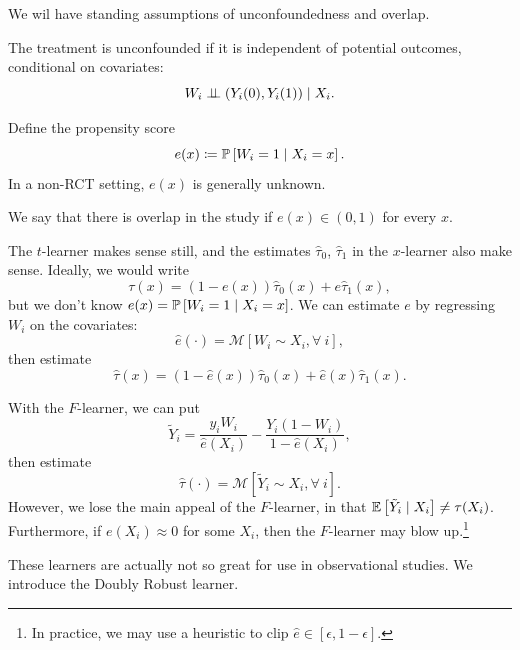\begin{assumption}
	We wil have standing assumptions of unconfoundedness and overlap.
\end{assumption}

\begin{definition}[Unconfoundedness]
	The treatment is unconfounded if it is independent of potential outcomes, conditional on covariates: \[
		W_i \ind \left( Y_i(0), Y_i(1) \right) \mid X_i
	.\] 
\end{definition}
\begin{definition}
	Define the propensity score \[
		e(x) \coloneqq \P\left[W_i = 1 \mid X_i=x\right] 
	.\] In a non-RCT setting, $e(x)$ is generally unknown.

		We say that there is overlap in the study if $e(x) \in (0,1)$ for every $x$.
\end{definition}

The $t$-learner makes sense still, and the estimates $\hat{\tau}_0$, $\hat{\tau}_1$ in the $x$-learner also make sense. Ideally, we would write \[
	\tau(x) = (1-e(x)) \hat{\tau}_0(x) + e \hat{\tau}_1(x)
,\] but we don't know $e(x) = \P\left[W_i = 1 \mid X_i = x\right] $. We can estimate $e$ by regressing $W_i$ on the covariates: \[
	\hat{e}(\cdot ) = \mathscr{M}\left[ W_i \sim X_i, \forall\ i \right]
,\] then estimate \[
	\hat{\tau}(x) = (1-\hat{e}(x)) \hat{\tau}_0(x) + \hat{e}(x) \hat{\tau}_1(x)
.\] 

With the $F$-learner, 
we can put \[
	\tilde{Y}_i = \frac{y_iW_i}{\hat{e}(X_i)} - \frac{Y_i (1-W_i)}{1- \hat{e}(X_i)}
,\] then estimate \[
\hat{\tau}(\cdot ) = \mathscr{M}\left[ \tilde{Y}_i \sim X_i, \forall\ i \right]
.\] 
However, we lose the main appeal of the $F$-learner, in that $\E\left[\tilde{Y}_i \mid X_i\right] \ne \tau(X_i)$. Furthermore, if $e(X_i) \approx 0$ for some $X_i$, then the $F$-learner may blow up.\footnote{In practice, we may use a heuristic to clip $\hat{e} \in [\epsilon,1-\epsilon]$.}

These learners are actually not so great for use in observational studies.
We introduce the Doubly Robust learner.

